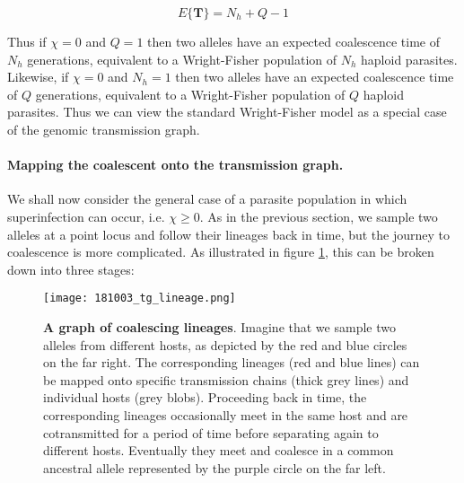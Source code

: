 \documentclass[_main.tex]{subfiles}
\begin{document}
\begin{equation*}
\label{eq:Nh+Q-1}
E \{ \textbf{T} \}   
= N_h + Q - 1
\end{equation*}

Thus if $\chi=0$ and $Q = 1$ then two alleles have an expected coalescence time of $N_h$ generations, equivalent to a Wright-Fisher population of $N_h$ haploid parasites.  Likewise, if $\chi=0$ and $N_h = 1$ then two alleles have an expected coalescence time of $Q$ generations, equivalent to a Wright-Fisher population of $Q$ haploid parasites.  Thus we can view the standard Wright-Fisher model as a special case of the genomic transmission graph.

\paragraph{Mapping the coalescent onto the transmission graph.}
\label{main_map_coalescent}

We shall now consider the general case of a parasite population in which superinfection can occur, i.e. $\chi \ge 0$.  As in the previous section, we sample two alleles at a point locus and follow their lineages back in time, but the journey to coalescence is more complicated.  As illustrated in figure \ref{fig:graph_1}, this can be broken down into three stages:

\begin{figure}[htb]
\centering
\texttt{[image: 181003\_tg\_lineage.png]}
\caption{\textbf{A graph of coalescing lineages}.  Imagine that we sample two alleles from different hosts, as depicted by the red and blue circles on the far right.  The corresponding lineages (red and blue lines) can be mapped onto specific transmission chains (thick grey lines) and individual hosts (grey blobs).   Proceeding back in time, the corresponding lineages occasionally meet in the same host and are cotransmitted for a period of time before separating again to different hosts.  Eventually they meet and coalesce in a common ancestral allele represented by the purple circle on the far left.}
\label{fig:graph_1}
\end{figure}
\end{document}
